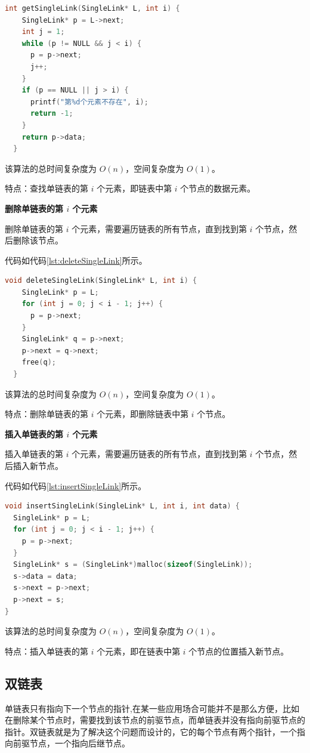 \documentclass[lang=cn,newtx,10pt,scheme=chinese]{../elegantbook}
\begin{document}
\begin{lstlisting}[language=C++, caption={查找单链表的第 $i$ 个元素示例代码}, label={lst:getSingleLink}]
  int getSingleLink(SingleLink* L, int i) {
    SingleLink* p = L->next;
    int j = 1;
    while (p != NULL && j < i) {
      p = p->next;
      j++;
    }
    if (p == NULL || j > i) {
      printf("第%d个元素不存在", i);
      return -1;
    }
    return p->data;
  }
\end{lstlisting}
该算法的总时间复杂度为 $O(n)$，空间复杂度为 $O(1)$。

特点：查找单链表的第 $i$ 个元素，即链表中第 $i$ 个节点的数据元素。

\textbf{删除单链表的第 $i$ 个元素}

删除单链表的第 $i$ 个元素，需要遍历链表的所有节点，直到找到第 $i$ 个节点，然后删除该节点。

代码如代码\ref{lst:deleteSingleLink}所示。

\begin{lstlisting}[language=C++, caption={删除单链表的第 $i$ 个元素示例代码}, label={lst:deleteSingleLink}]
  void deleteSingleLink(SingleLink* L, int i) {
    SingleLink* p = L;
    for (int j = 0; j < i - 1; j++) {
      p = p->next;
    }
    SingleLink* q = p->next;
    p->next = q->next;
    free(q);
  }
  \end{lstlisting}
  该算法的总时间复杂度为 $O(n)$，空间复杂度为 $O(1)$。

  特点：删除单链表的第 $i$ 个元素，即删除链表中第 $i$ 个节点。

\textbf{插入单链表的第 $i$ 个元素}

插入单链表的第 $i$ 个元素，需要遍历链表的所有节点，直到找到第 $i$ 个节点，然后插入新节点。

代码如代码\ref{lst:insertSingleLink}所示。

\begin{lstlisting}[language=C++, caption={插入单链表的第 $i$ 个元素示例代码}, label={lst:insertSingleLink}]
void insertSingleLink(SingleLink* L, int i, int data) {
  SingleLink* p = L;
  for (int j = 0; j < i - 1; j++) {
    p = p->next;
  }
  SingleLink* s = (SingleLink*)malloc(sizeof(SingleLink));
  s->data = data;
  s->next = p->next;
  p->next = s;
}
\end{lstlisting}
该算法的总时间复杂度为 $O(n)$，空间复杂度为 $O(1)$。

特点：插入单链表的第 $i$ 个元素，即在链表中第 $i$ 个节点的位置插入新节点。
   



  \subsection{双链表}
  单链表只有指向下一个节点的指针,在某一些应用场合可能并不是那么方便，比如在删除某个节点时，需要找到该节点的前驱节点，而单链表并没有指向前驱节点的指针。双链表就是为了解决这个问题而设计的，它的每个节点有两个指针，一个指向前驱节点，一个指向后继节点。
  
\end{document}

